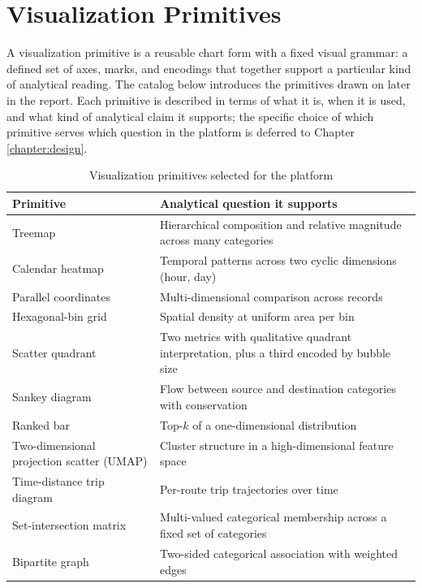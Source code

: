 \section{Visualization Primitives}
\label{sec:foundations:primitives}

A visualization primitive is a reusable chart form with a fixed visual
grammar: a defined set of axes, marks, and encodings that together
support a particular kind of analytical reading. The catalog below
introduces the primitives drawn on later in the report. Each primitive
is described in terms of what it is, when it is used, and what kind of
analytical claim it supports; the specific choice of which primitive
serves which question in the platform is deferred to Chapter
\ref{chapter:design}.

\begin{table}[!htbp]
\centering
\caption{Visualization primitives selected for the platform}
\label{tab:foundations:primitives}
\footnotesize
\renewcommand{\arraystretch}{1.25}
\begin{tabularx}{\linewidth}{p{3.6cm} X}
\hline
\textbf{Primitive} & \textbf{Analytical question it supports} \\
\hline
Treemap                                     & Hierarchical composition and relative magnitude across many categories \\
Calendar heatmap                            & Temporal patterns across two cyclic dimensions (hour, day) \\
Parallel coordinates                        & Multi-dimensional comparison across records \\
Hexagonal-bin grid                          & Spatial density at uniform area per bin \\
Scatter quadrant                            & Two metrics with qualitative quadrant interpretation, plus a third encoded by bubble size \\
Sankey diagram                              & Flow between source and destination categories with conservation \\
Ranked bar                                  & Top-$k$ of a one-dimensional distribution \\
Two-dimensional projection scatter (UMAP)   & Cluster structure in a high-dimensional feature space \\
Time-distance trip diagram                  & Per-route trip trajectories over time \\
Set-intersection matrix                     & Multi-valued categorical membership across a fixed set of categories \\
Bipartite graph                             & Two-sided categorical association with weighted edges \\
\hline
\end{tabularx}
\end{table}

